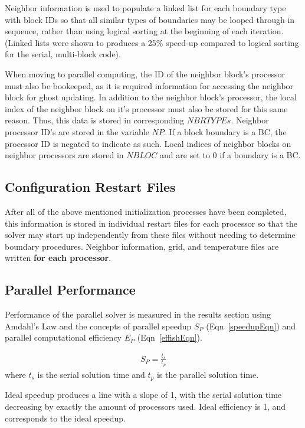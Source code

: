 \documentclass[twocolumn,10pt]{asme2ej}
\begin{document}
Neighbor information is used to populate a linked list for each boundary type with block IDs so that all similar types of boundaries may be looped through in sequence, rather than using logical sorting at the beginning of each iteration.  (Linked lists were shown to produces a 25\% speed-up compared to logical sorting for the serial, multi-block code).

When moving to parallel computing, the ID of the neighbor block’s processor must also be bookeeped, as it is required information for accessing the neighbor block for ghost updating.  In addition to the neighbor block’s processor, the local index of the neighbor block on it’s processor must also be stored for this same reason.  Thus, this data is stored in corresponding $NBRTYPEs$.  Neighbor processor ID’s are stored in the variable $NP$.  If a block boundary is a BC, the processor ID is negated to indicate as such.  Local indices of neighbor blocks on neighbor processors are stored in $NBLOC$ and are set to 0 if a boundary is a BC.

\subsection{Configuration Restart Files}
After all of the above mentioned initialization processes have been completed, this information is stored in individual restart files for each processor so that the solver may start up independently from these files without needing to determine boundary procedures.  Neighbor information, grid, and temperature files are written \textbf{for each processor}.

\subsection{Parallel Performance}
Performance of the parallel solver is measured in the results section using Amdahl's Law and the concepts of parallel speedup $S_P$ (Eqn~\ref{speedupEqn}) and parallel computational efficiency $E_P$ (Eqn~\ref{effishEqn}).

\vspace{-1em}
\begin{equation}
\begin{split}
S_P = \frac{t_s}{t_p}
\end{split}
\label{speedupEqn}
\end{equation}
\noindent where $t_s$ is the serial solution time and $t_p$ is the parallel solution time.

Ideal speedup produces a line with a slope of 1, with the serial solution time decreasing by exactly the amount of processors used.  Ideal efficiency is 1, and corresponds to the ideal speedup.
\end{document}
